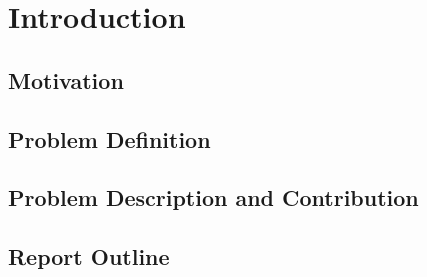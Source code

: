
\chapter{Introduction}

\section{Motivation}
\section{Problem Definition}
\section{Problem Description and Contribution}
\section{Report Outline}

\cleardoublepage